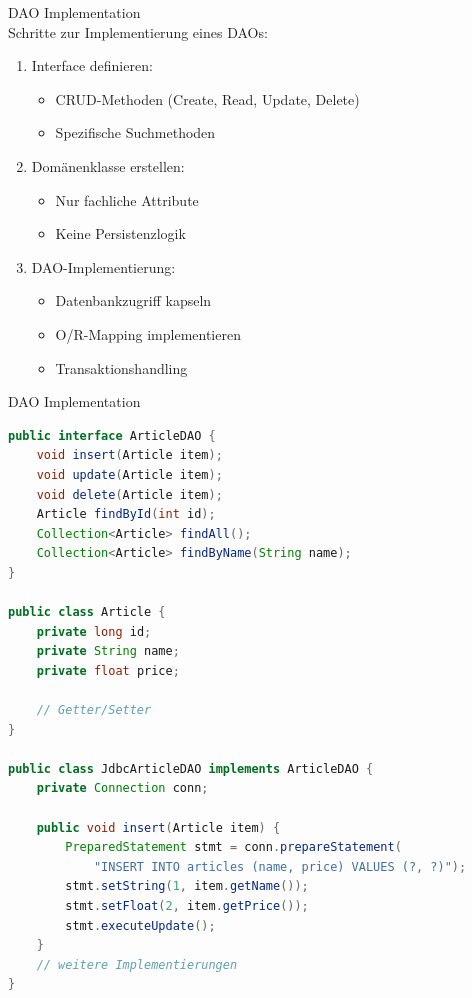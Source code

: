 \begin{KR}{DAO Implementation}\\
Schritte zur Implementierung eines DAOs:
\begin{enumerate}
    \item Interface definieren:
    \begin{itemize}
        \item CRUD-Methoden (Create, Read, Update, Delete)
        \item Spezifische Suchmethoden
    \end{itemize}
    \item Domänenklasse erstellen:
    \begin{itemize}
        \item Nur fachliche Attribute
        \item Keine Persistenzlogik
    \end{itemize}
    \item DAO-Implementierung:
    \begin{itemize}
        \item Datenbankzugriff kapseln
        \item O/R-Mapping implementieren
        \item Transaktionshandling
    \end{itemize}
\end{enumerate}
\end{KR}

\begin{example2}{DAO Implementation}
\begin{lstlisting}[language=Java, style=base]
public interface ArticleDAO {
    void insert(Article item);
    void update(Article item);
    void delete(Article item);
    Article findById(int id);
    Collection<Article> findAll();
    Collection<Article> findByName(String name);
}

public class Article {
    private long id;
    private String name;
    private float price;
    
    // Getter/Setter
}

public class JdbcArticleDAO implements ArticleDAO {
    private Connection conn;
    
    public void insert(Article item) {
        PreparedStatement stmt = conn.prepareStatement(
            "INSERT INTO articles (name, price) VALUES (?, ?)");
        stmt.setString(1, item.getName());
        stmt.setFloat(2, item.getPrice());
        stmt.executeUpdate();
    }
    // weitere Implementierungen
}
\end{lstlisting}
\end{example2}

